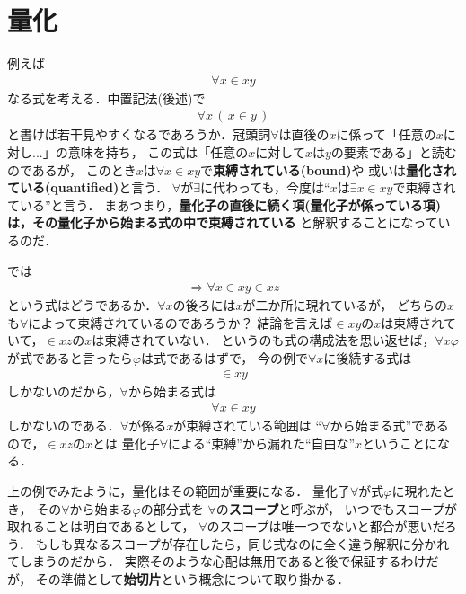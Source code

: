 \chapter{量化}
	例えば
	\begin{align}
		\forall x \in x y
	\end{align}
	なる式を考える．中置記法(後述)で
	\begin{align}
		\forall x\, (\, x \in y\, )
	\end{align}
	と書けば若干見やすくなるであろうか．冠頭詞$\forall$は直後の$x$に係って「任意の$x$に対し...」の意味を持ち，
	この式は「任意の$x$に対して$x$は$y$の要素である」と読むのであるが，
	このとき$x$は$\forall x \in x y$で{\bf 束縛されている}{\bf (bound)}や
	或いは{\bf 量化されている}{\bf (quantified)}と言う．
	$\forall$が$\exists$に代わっても，今度は``$x$は$\exists x \in x y$で束縛されている''と言う．
	まあつまり，{\bf 量化子の直後に続く項(量化子が係っている項)は，その量化子から始まる式の中で束縛されている}
	と解釈することになっているのだ．
	
	では
	\begin{align}
		\Longrightarrow \forall x \in x y \in x z
	\end{align}
	という式はどうであるか．$\forall x$の後ろには$x$が二か所に現れているが，
	どちらの$x$も$\forall$によって束縛されているのであろうか？
	結論を言えば$\in x y$の$x$は束縛されていて，$\in x z$の$x$は束縛されていない．
	というのも式の構成法を思い返せば，$\forall x \varphi$が式であると言ったら$\varphi$は式であるはずで，
	今の例で$\forall x$に後続する式は
	\begin{align}
		\in x y
	\end{align}
	しかないのだから，$\forall$から始まる式は
	\begin{align}
		\forall x \in x y
	\end{align}
	しかないのである．$\forall$が係る$x$が束縛されている範囲は
	``$\forall$から始まる式''であるので，$\in x z$の$x$とは
	量化子$\forall$による``束縛''から漏れた``自由な''$x$ということになる．
	
	上の例でみたように，量化はその範囲が重要になる．
	量化子$\forall$が式$\varphi$に現れたとき，
	その$\forall$から始まる$\varphi$の部分式を
	$\forall$の{\bf スコープ}と呼ぶが，
	いつでもスコープが取れることは明白であるとして，
	$\forall$のスコープは唯一つでないと都合が悪いだろう．
	もしも異なるスコープが存在したら，同じ式なのに全く違う解釈に分かれてしまうのだから．
	実際そのような心配は無用であると後で保証するわけだが，
	その準備として{\bf 始切片}という概念について取り掛かる．
	
